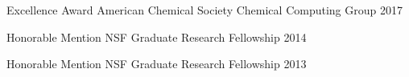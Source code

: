 



\begin{cvhonors}



\cvhonor
{Excellence Award} %
{American Chemical Society Chemical Computing Group} %
{} %
{2017} %








\cvhonor
{Honorable Mention} %
{NSF Graduate Research Fellowship} %
{} %
{2014} %


\cvhonor
{Honorable Mention} %
{NSF Graduate Research Fellowship} %
{} %
{2013} %




\end{cvhonors}
